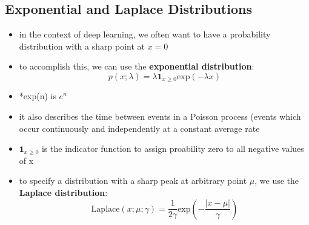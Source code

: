 \documentclass[11pt, twocolumn]{report}
\begin{document}
\subsection{Exponential and Laplace Distributions}
\begin{itemize}
  \item in the context of deep learning, we often want to have a probability
    distribution with a sharp point at $x = 0$
  \item to accomplish this, we can use the \textbf{exponential distribution}:
    \begin{equation}
      p(x;\lambda) = \lambda\bm{1}_{x \geq 0}\text{exp}(-\lambda x)
    \end{equation}
  \item *exp(n) is $e^n$
  \item it also describes the time between events in a Poisson process (events
    which occur continuously and independently at a constant average rate
  \item $\bm{1}_{x \geq 0}$ is the indicator function to assign proability zero
    to all negative values of x
  \item to specify a distribution with a sharp peak at arbitrary point $\mu$,
    we use the \textbf{Laplace distribution}:
    \begin{equation}
      \text{Laplace}(x;\mu;\gamma) =
      \frac{1}{2\gamma}\text{exp}\left(-\frac{|x - \mu|}{\gamma}\right)
    \end{equation}
\end{itemize}
\end{document}
